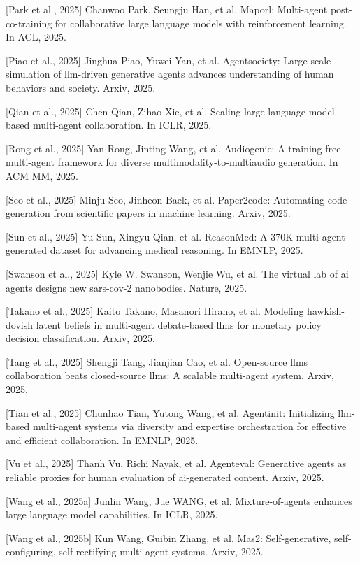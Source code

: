 \documentclass[UTF8,a4paper,12pt]{article}
\begin{document}
{[}Park et al., 2025{]} Chanwoo Park, Seungju Han, et al. Maporl: Multi-agent post-co-training for collaborative large language models with reinforcement learning. In ACL, 2025.

{[}Piao et al., 2025{]} Jinghua Piao, Yuwei Yan, et al. Agentsociety: Large-scale simulation of llm-driven generative agents advances understanding of human behaviors and society. Arxiv, 2025.

{[}Qian et al., 2025{]} Chen Qian, Zihao Xie, et al. Scaling large language model-based multi-agent collaboration. In ICLR, 2025.

{[}Rong et al., 2025{]} Yan Rong, Jinting Wang, et al. Audiogenie: A training-free multi-agent framework for diverse multimodality-to-multiaudio generation. In ACM MM, 2025.

{[}Seo et al., 2025{]} Minju Seo, Jinheon Baek, et al. Paper2code: Automating code generation from scientific papers in machine learning. Arxiv, 2025.

{[}Sun et al., 2025{]} Yu Sun, Xingyu Qian, et al. ReasonMed: A 370K multi-agent generated dataset for advancing medical reasoning. In EMNLP, 2025.

{[}Swanson et al., 2025{]} Kyle W. Swanson, Wenjie Wu, et al. The virtual lab of ai agents designs new sars-cov-2 nanobodies. Nature, 2025.

{[}Takano et al., 2025{]} Kaito Takano, Masanori Hirano, et al. Modeling hawkish-dovish latent beliefs in multi-agent debate-based llms for monetary policy decision classification. Arxiv, 2025.

{[}Tang et al., 2025{]} Shengji Tang, Jianjian Cao, et al. Open-source llms collaboration beats closed-source llms: A scalable multi-agent system. Arxiv, 2025.

{[}Tian et al., 2025{]} Chunhao Tian, Yutong Wang, et al. Agentinit: Initializing llm-based multi-agent systems via diversity and expertise orchestration for effective and efficient collaboration. In EMNLP, 2025.

{[}Vu et al., 2025{]} Thanh Vu, Richi Nayak, et al. Agenteval: Generative agents as reliable proxies for human evaluation of ai-generated content. Arxiv, 2025.

{[}Wang et al., 2025a{]} Junlin Wang, Jue WANG, et al. Mixture-of-agents enhances large language model capabilities. In ICLR, 2025.

{[}Wang et al., 2025b{]} Kun Wang, Guibin Zhang, et al. Mas2: Self-generative, self-configuring, self-rectifying multi-agent systems. Arxiv, 2025.
\end{document}
